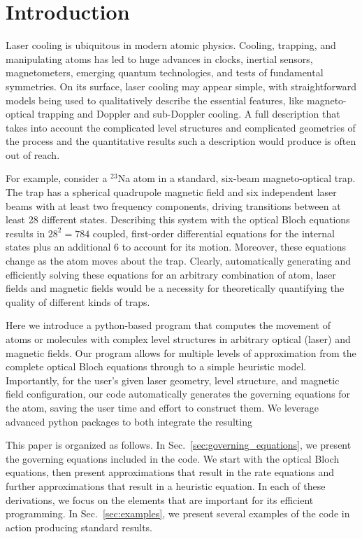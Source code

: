 \documentclass[final,5p,times,twocolumn]{elsarticle}
\begin{document}
\section{Introduction}
\label{sec:intro}
Laser cooling is ubiquitous in modern atomic physics.  Cooling, trapping, and manipulating atoms has led to huge advances in clocks, inertial sensors, magnetometers, emerging quantum technologies, and tests of fundamental symmetries.  On its surface, laser cooling may appear simple, with straightforward models being used to qualitatively describe the essential features, like magneto-optical trapping and Doppler and sub-Doppler cooling.  A full description that takes into account the complicated level structures and complicated geometries of the process and the quantitative results such a description would produce is often out of reach.

For example, consider a $^{23}$Na atom in a standard, six-beam magneto-optical trap.  The trap has a spherical quadrupole magnetic field and six independent laser beams with at least two frequency components, driving transitions between at least 28 different states.  Describing this system  with the optical Bloch equations results in $28^2=784$ coupled, first-order differential equations for the internal states plus an additional 6 to account for its motion.  Moreover, these equations change as the atom moves about the trap.  Clearly, automatically generating and efficiently solving these equations for an arbitrary combination of atom, laser fields and magnetic fields would be a necessity for theoretically quantifying the quality of different kinds of traps.  

Here we introduce a python-based program that computes the movement of atoms or molecules with complex level structures in arbitrary optical (laser) and magnetic fields.  Our program allows for multiple levels of approximation from the complete optical Bloch equations through to a simple heuristic model.  Importantly, for the user's given laser geometry, level structure, and magnetic field configuration, our code automatically generates the governing equations for the atom, saving the user time and effort to construct them.  We leverage advanced python packages to both integrate the resulting 

This paper is organized as follows.  In Sec.~\ref{sec:governing_equations}, we present the governing equations included in the code.  We start with the optical Bloch equations, then present approximations that result in the rate equations and further approximations that result in a heuristic equation.  In each of these derivations, we focus on the elements that are important for its efficient programming.  In Sec.~\ref{sec:examples}, we present several examples of the code in action producing standard results.
\end{document}

